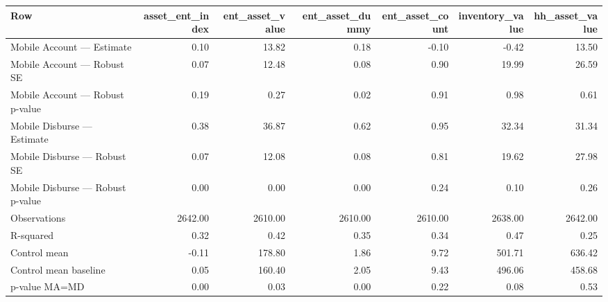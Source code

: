 
\begin{tabular}{lrrrrrr}
\toprule
Row & asset\_ent\_index & ent\_asset\_value & ent\_asset\_dummy & ent\_asset\_count & inventory\_value & hh\_asset\_value\\
\midrule
Mobile Account — Estimate & 0.10 & 13.82 & 0.18 & -0.10 & -0.42 & 13.50\\
Mobile Account — Robust SE & 0.07 & 12.48 & 0.08 & 0.90 & 19.99 & 26.59\\
Mobile Account — Robust p-value & 0.19 & 0.27 & 0.02 & 0.91 & 0.98 & 0.61\\
Mobile Disburse — Estimate & 0.38 & 36.87 & 0.62 & 0.95 & 32.34 & 31.34\\
Mobile Disburse — Robust SE & 0.07 & 12.08 & 0.08 & 0.81 & 19.62 & 27.98\\
\addlinespace
Mobile Disburse — Robust p-value & 0.00 & 0.00 & 0.00 & 0.24 & 0.10 & 0.26\\
Observations & 2642.00 & 2610.00 & 2610.00 & 2610.00 & 2638.00 & 2642.00\\
R-squared & 0.32 & 0.42 & 0.35 & 0.34 & 0.47 & 0.25\\
Control mean & -0.11 & 178.80 & 1.86 & 9.72 & 501.71 & 636.42\\
Control mean baseline & 0.05 & 160.40 & 2.05 & 9.43 & 496.06 & 458.68\\
\addlinespace
p-value MA=MD & 0.00 & 0.03 & 0.00 & 0.22 & 0.08 & 0.53\\
\bottomrule
\end{tabular}
